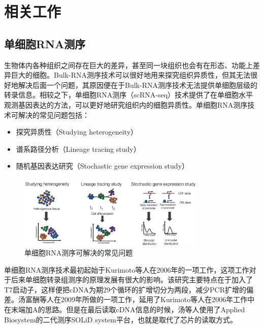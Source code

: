 
\chapter{相关工作}

\section{单细胞RNA测序}
  生物体内各种组织之间存在巨大的差异，甚至同一块组织也会有在形态、功能上差异巨大的细胞。Bulk-RNA测序技术可以很好地用来探究组织异质性，但其无法很好地解决后面一个问题，其原因便在于Bulk-RNA测序技术无法提供单细胞层级的转录信息。相较之下，单细胞RNA测序（scRNA-seq）技术提供了在单细胞水平观测基因表达的方法，可以更好地研究组织内的细胞异质性\cite{hammond2019single,keren2017unique,li2019developmental,masuda2019spatial,masuda2020novel,matcovitch2016microglia}。单细胞RNA测序技术可解决的常见问题\cite{liu2016single,junker2014every}包括：
\begin{itemize}
    \item 探究异质性（Studying heterogeneity）
    \item 谱系路径分析（Lineage tracing study）
    \item 随机基因表达研究（Stochastic gene expression study）
\end{itemize}

\begin{figure}[!htb]
  \centering
  \includegraphics[width=0.8\textwidth]{figs/scseq-purpose.png}
  \caption{单细胞RNA测序可解决的常见问题}
  \label{fig:scseq-purpose}
\end{figure}

  单细胞RNA测序技术最初起始于Kurimoto等人在2006年的一项工作\cite{kurimoto2006improved}，这项工作对于后来单细胞转录组测序的原理发展有很大的影响。该研究主要特点在于加入了T7启动子，这样便把cDNA为期29个循环的扩增切分为两段，减少PCR扩增的偏差。汤富酬等人在2009年所做的一项工作\cite{tang2009mrna}，延用了Kurimoto等人在2006年工作\cite{kurimoto2006improved}中在末端加A的思路。但是在最后读取cDNA信息的时候，汤等人使用了Applied Biosystem的二代测序SOLiD system平台，也就是取代了芯片的读取方式。

